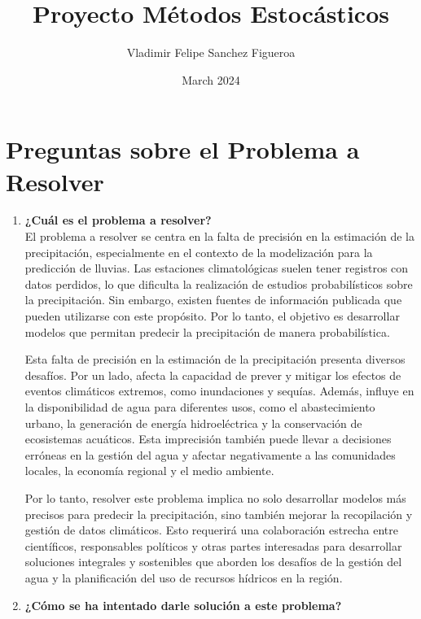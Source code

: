 \documentclass{article}
\title{Proyecto Métodos Estocásticos}
\author{Vladimir Felipe Sanchez Figueroa}
\date{March 2024}
\begin{document}
\maketitle

\section{Preguntas sobre el Problema a Resolver}

\begin{enumerate}
    \item \textbf{¿Cuál es el problema a resolver?} \\

     El problema a resolver se centra en la falta de precisión en la estimación de la precipitación, especialmente en el contexto de la modelización para la predicción de lluvias. Las estaciones climatológicas suelen tener registros con datos perdidos, lo que dificulta la realización de estudios probabilísticos sobre la precipitación. Sin embargo, existen fuentes de información publicada que pueden utilizarse con este propósito. Por lo tanto, el objetivo es desarrollar modelos que permitan predecir la precipitación de manera probabilística.
    

    Esta falta de precisión en la estimación de la precipitación presenta diversos desafíos. Por un lado, afecta la capacidad de prever y mitigar los efectos de eventos climáticos extremos, como inundaciones y sequías. Además, influye en la disponibilidad de agua para diferentes usos, como el abastecimiento urbano, la generación de energía hidroeléctrica y la conservación de ecosistemas acuáticos. Esta imprecisión también puede llevar a decisiones erróneas en la gestión del agua y afectar negativamente a las comunidades locales, la economía regional y el medio ambiente.
    

    Por lo tanto, resolver este problema implica no solo desarrollar modelos más precisos para predecir la precipitación, sino también mejorar la recopilación y gestión de datos climáticos. Esto requerirá una colaboración estrecha entre científicos, responsables políticos y otras partes interesadas para desarrollar soluciones integrales y sostenibles que aborden los desafíos de la gestión del agua y la planificación del uso de recursos hídricos en la región.

    
    \item \textbf{¿Cómo se ha intentado darle solución a este problema?}\\


\end{enumerate}
\end{document}
